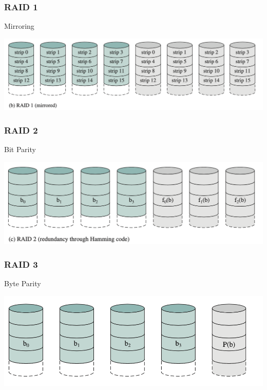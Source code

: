 \begin{frame}
\frametitle{RAID 1}

Mirroring

\begin{center}
	\includegraphics[width= \textwidth]{images/raid1.png }
\end{center}

\end{frame}


\begin{frame}
\frametitle{RAID 2}

Bit Parity

\begin{center}
	\includegraphics[width= \textwidth]{images/raid2.png }
\end{center}


\end{frame}


\begin{frame}
\frametitle{RAID 3}

Byte Parity

\begin{center}
	\includegraphics[width= \textwidth]{images/raid3.png}
\end{center}


\end{frame}


